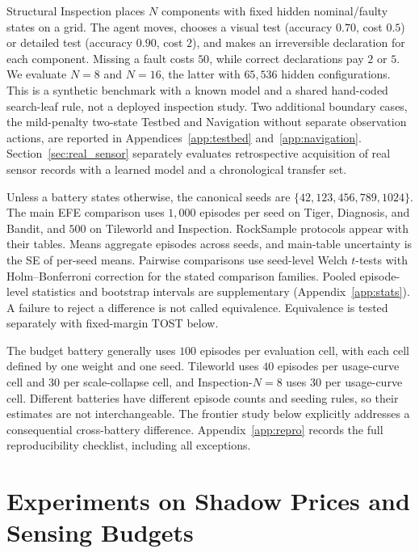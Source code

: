 \documentclass[manuscript, screen, review]{jair}
\begin{document}
Structural Inspection places $N$ components with fixed hidden nominal/faulty states on a grid. The agent moves, chooses a visual test (accuracy $0.70$, cost $0.5$) or detailed test (accuracy $0.90$, cost $2$), and makes an irreversible declaration for each component. Missing a fault costs $50$, while correct declarations pay $2$ or $5$. We evaluate $N{=}8$ and $N{=}16$, the latter with $65{,}536$ hidden configurations. This is a synthetic benchmark with a known model and a shared hand-coded search-leaf rule, not a deployed inspection study. Two additional boundary cases, the mild-penalty two-state Testbed and Navigation without separate observation actions, are reported in Appendices~\ref{app:testbed} and~\ref{app:navigation}. Section~\ref{sec:real_sensor} separately evaluates retrospective acquisition of real sensor records with a learned model and a chronological transfer set.

Unless a battery states otherwise, the canonical seeds are $\{42,\allowbreak 123,\allowbreak 456,\allowbreak 789,\allowbreak 1024\}$. The main EFE comparison uses $1{,}000$ episodes per seed on Tiger, Diagnosis, and Bandit, and $500$ on Tileworld and Inspection. RockSample protocols appear with their tables. Means aggregate episodes across seeds, and main-table uncertainty is the SE of per-seed means. Pairwise comparisons use seed-level Welch $t$-tests with Holm--Bonferroni correction for the stated comparison families. Pooled episode-level statistics and bootstrap intervals are supplementary (Appendix~\ref{app:stats}). A failure to reject a difference is not called equivalence. Equivalence is tested separately with fixed-margin TOST below.

The budget battery generally uses $100$ episodes per evaluation cell, with each cell defined by one weight and one seed. Tileworld uses $40$ episodes per usage-curve cell and $30$ per scale-collapse cell, and Inspection-$N{=}8$ uses $30$ per usage-curve cell. Different batteries have different episode counts and seeding rules, so their estimates are not interchangeable. The frontier study below explicitly addresses a consequential cross-battery difference. Appendix~\ref{app:repro} records the full reproducibility checklist, including all exceptions.

\section{Experiments on Shadow Prices and Sensing Budgets}
\label{sec:budget_experiments}
\end{document}
